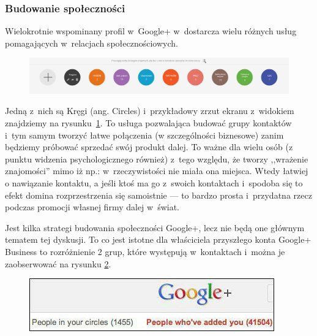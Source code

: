 
\subsubsection{Budowanie społeczności}
Wielokrotnie wspominany profil w~Google+ w~dostarcza wielu różnych usług pomagających w~relacjach społecznościowych.

\begin{figure}[!h]
\centering
    \scalebox{0.25}
    {
        \includegraphics{images/google-plus-circles.png}
    }
    \label{fig:google-plus-circles}
\end{figure}

Jedną z~nich są Kręgi (ang. Circles) i~przykładowy zrzut ekranu z~widokiem znajdziemy na rysunku~\ref{fig:google-plus-circles}. To usługa pozwalająca budować grupy kontaktów i~tym samym tworzyć łatwe połączenia (w szczególności biznesowe) zanim będziemy próbować sprzedać swój produkt dalej. To ważne dla wielu osób (z punktu widzenia psychologicznego również) z~tego względu, że tworzy ,,wrażenie znajomości'' mimo iż np.: w~rzeczywistości nie miała ona miejsca.
Wtedy łatwiej o nawiązanie kontaktu, a jeśli ktoś ma go z~swoich kontaktach i~spodoba się to efekt domina rozprzestrzenia się samoistnie --- to bardzo prosta i~przydatna rzecz podczas promocji własnej firmy dalej w~świat.

Jest kilka strategi budowania społeczności Google+, lecz nie będą one głównym tematem tej dyskusji. To co jest istotne dla właściciela przyszłego konta Google+ Business to rozróżnienie 2 grup, które występują w~kontaktach i~można je zaobserwować na rysunku \ref{fig:size-of-audience-in-google-plus-circles}. 

\begin{figure}[!h]
\centering
    \scalebox{0.7}
    {
        \includegraphics{images/size-of-audience-in-google-plus-circles.png}
    }
    \label{fig:size-of-audience-in-google-plus-circles}
\end{figure}

